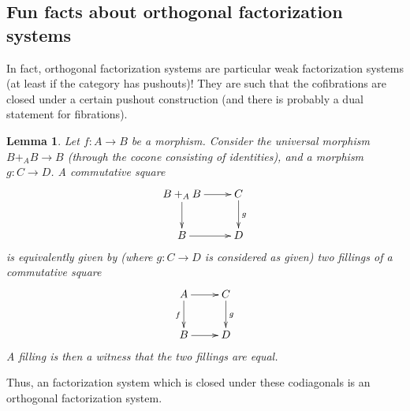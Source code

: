 \documentclass{article}
\newtheorem{corollary}[theorem]{Corollary}
\newtheorem{lemma}[theorem]{Lemma}
\begin{document}
\subsection{Fun facts about orthogonal factorization systems}
In fact, orthogonal factorization systems are particular weak factorization
systems (at least if the category has pushouts)! They are such that the cofibrations are closed under a certain
pushout construction (and there is probably a dual statement for fibrations).

\begin{lemma}
  Let $f:A \rightarrow B$  be a morphism. Consider the universal morphism $B+_A B
  \rightarrow B$ (through the cocone consisting of identities), and a morphism
  $g : C \rightarrow D$.
  A commutative square
  \[
    \xymatrix{
      B+_A B \ar[r]\ar[d] & C \ar[d]^{g} \\
      B \ar[r]& D
    }
  \]
  is equivalently given by (where $g:C\rightarrow D$ is considered as given) two
  fillings of a commutative square
  \[
    \xymatrix{
      A \ar[r]\ar[d]_f & C \ar[d]^{g} \\
      B \ar[r]& D
    }
  \]
  A filling is then a witness that the two fillings are equal.
\end{lemma}
Thus, an factorization system which is closed under these codiagonals
is an orthogonal factorization system.
\end{document}
